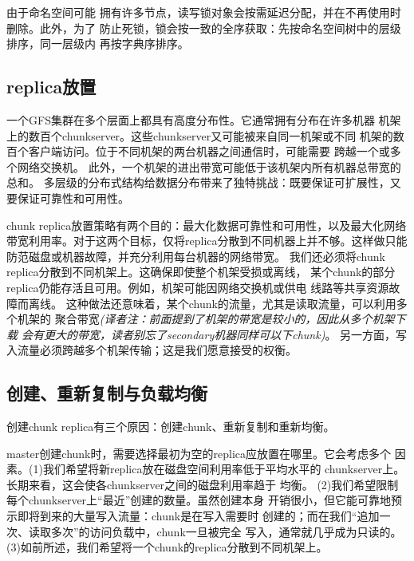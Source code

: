由于命名空间可能
拥有许多节点，读写锁对象会按需延迟分配，并在不再使用时删除。此外，为了
防止死锁，锁会按一致的全序获取：先按命名空间树中的层级排序，同一层级内
再按字典序排序。

\subsection{replica放置}
一个GFS集群在多个层面上都具有高度分布性。它通常拥有分布在许多机器
机架上的数百个chunkserver。这些chunkserver又可能被来自同一机架或不同
机架的数百个客户端访问。位于不同机架的两台机器之间通信时，可能需要
跨越一个或多个网络交换机。
此外，一个机架的进出带宽可能低于该机架内所有机器总带宽的总和。
多层级的分布式结构给数据分布带来了独特挑战：既要保证可扩展性，又要保证可靠性和可用性。

chunk replica放置策略有两个目的：最大化数据可靠性和可用性，以及最大化网络
带宽利用率。对于这两个目标，仅将replica分散到不同机器上并不够。这样做只能
防范磁盘或机器故障，并充分利用每台机器的网络带宽。
我们还必须将chunk replica分散到不同机架上。这确保即使整个机架受损或离线，
某个chunk的部分replica仍能存活且可用。例如，机架可能因网络交换机或供电
线路等共享资源故障而离线。
这种做法还意味着，某个chunk的流量，尤其是读取流量，可以利用多个机架的
聚合带宽\emph{(译者注：前面提到了机架的带宽是较小的，因此从多个机架下载
会有更大的带宽，读者别忘了secondary机器同样可以下chunk)}。
另一方面，写入流量必须跨越多个机架传输；这是我们愿意接受的权衡。

\subsection{创建、重新复制与负载均衡}
创建chunk replica有三个原因：创建chunk、重新复制和重新均衡。

master创建chunk时，需要选择最初为空的replica应放置在哪里。它会考虑多个
因素。(1)我们希望将新replica放在磁盘空间利用率低于平均水平的
chunkserver上。长期来看，这会使各chunkserver之间的磁盘利用率趋于
均衡。
(2)我们希望限制每个chunkserver上“最近”创建的数量。虽然创建本身
开销很小，但它能可靠地预示即将到来的大量写入流量：chunk是在写入需要时
创建的；而在我们“追加一次、读取多次”的访问负载中，chunk一旦被完全
写入，通常就几乎成为只读的。
(3)如前所述，我们希望将一个chunk的replica分散到不同机架上。


